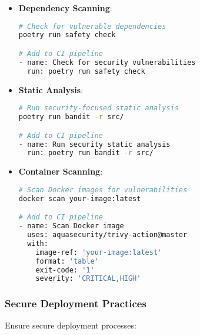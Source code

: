 \begin{itemize}
    \item \textbf{Dependency Scanning}:
    \begin{lstlisting}[language=bash]
# Check for vulnerable dependencies
poetry run safety check

# Add to CI pipeline
- name: Check for security vulnerabilities
  run: poetry run safety check
    \end{lstlisting}
    
    \item \textbf{Static Analysis}:
    \begin{lstlisting}[language=bash]
# Run security-focused static analysis
poetry run bandit -r src/

# Add to CI pipeline
- name: Run security static analysis
  run: poetry run bandit -r src/
    \end{lstlisting}
    
    \item \textbf{Container Scanning}:
    \begin{lstlisting}[language=bash]
# Scan Docker images for vulnerabilities
docker scan your-image:latest

# Add to CI pipeline
- name: Scan Docker image
  uses: aquasecurity/trivy-action@master
  with:
    image-ref: 'your-image:latest'
    format: 'table'
    exit-code: '1'
    severity: 'CRITICAL,HIGH'
    \end{lstlisting}
\end{itemize}

\subsubsection{Secure Deployment Practices}
Ensure secure deployment processes:

